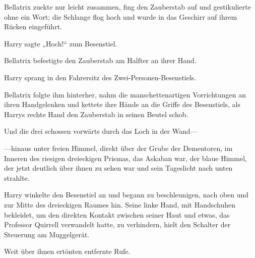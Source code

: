 Bellatrix zuckte nur leicht zusammen, fing den Zauberstab auf und gestikulierte ohne ein Wort; die Schlange flog hoch und wurde in das Geschirr auf ihrem Rücken eingeführt.

Harry sagte „Hoch!“ zum Besenstiel.

Bellatrix befestigte den Zauberstab am Halfter an ihrer Hand.

Harry sprang in den Fahrersitz des Zwei-Personen-Besenstiels.

Bellatrix folgte ihm hinterher, nahm die manschettenartigen Vorrichtungen an ihren Handgelenken und kettete ihre Hände an die Griffe des Besenstiels, als Harrys rechte Hand den Zauberstab in seinen Beutel schob.

Und die drei schossen vorwärts durch das Loch in der Wand—

—hinaus unter freien Himmel, direkt über der Grube der Dementoren, im Inneren des riesigen dreieckigen Prismas, das Askaban war, der blaue Himmel, der jetzt deutlich über ihnen zu sehen war und sein Tageslicht nach unten strahlte.

Harry winkelte den Besenstiel an und begann zu beschleunigen, nach oben und zur Mitte des dreieckigen Raumes hin. Seine linke Hand, mit Handschuhen bekleidet, um den direkten Kontakt zwischen seiner Haut und etwas, das Professor Quirrell verwandelt hatte, zu verhindern, hielt den Schalter der Steuerung am Muggelgerät.

Weit über ihnen ertönten entfernte Rufe.

